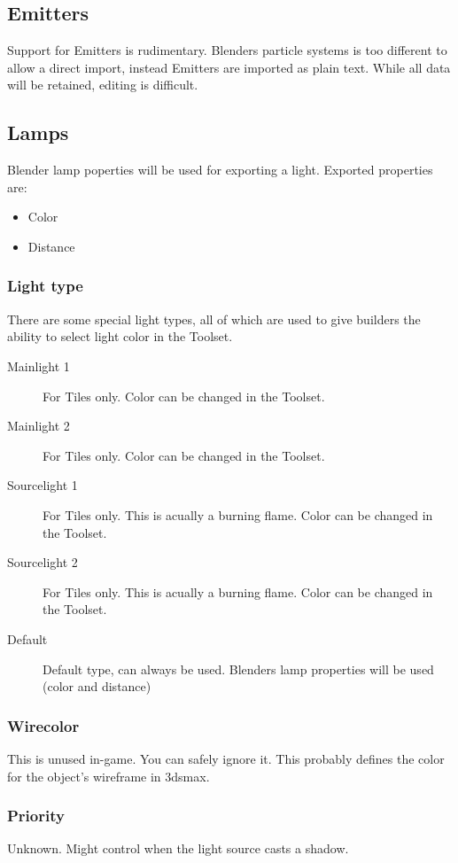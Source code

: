 \subsection{Emitters}
Support for Emitters is rudimentary. Blenders particle systems is too
different to allow a direct import, instead Emitters are imported as plain
text. While all data will be retained, editing is difficult.

\subsection{Lamps}
Blender lamp poperties will be used for exporting a light.
Exported properties are:
\begin{itemize}
    \item Color
    \item Distance
\end{itemize}

\subsubsection*{Light type}
There are some special light types, all of which are used to give builders
the ability to select light color in the Toolset.
\begin{description}
    \item[Mainlight 1] For Tiles only. Color can be changed in the Toolset.
    \item[Mainlight 2] For Tiles only. Color can be changed in the Toolset.
    \item[Sourcelight 1] For Tiles only. This is acually a burning flame. Color can be changed in the Toolset.
    \item[Sourcelight 2] For Tiles only. This is acually a burning flame. Color can be changed in the Toolset.
    \item[Default] Default type, can always be used. Blenders lamp properties will be used (color and distance)
\end{description}

\subsubsection*{Wirecolor}
This is unused in-game. You can safely ignore it. This probably defines the
color for the object's wireframe in 3dsmax.

\subsubsection*{Priority}
Unknown. Might control when the light source casts a shadow.

